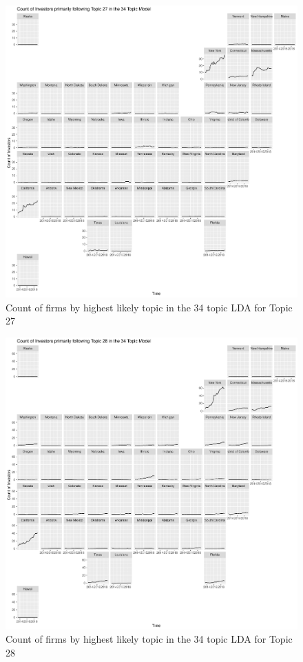 \begin{figure}
	\centering
	\includegraphics[width=1\linewidth]{Figures/ChapterV/USA_34_Topic27.pdf}
	\caption[Count of Firms for Topic 27 by Quarter]{Count of firms by highest likely topic in the 34 topic LDA for Topic 27}
	\label{fig:StateLDA27}
\end{figure}

\begin{figure}
	\centering
	\includegraphics[width=1\linewidth]{Figures/ChapterV/USA_34_Topic28.pdf}
	\caption[Count of Firms for Topic 28 by Quarter]{Count of firms by highest likely topic in the 34 topic LDA for Topic 28}
	\label{fig:StateLDA28}
\end{figure}

